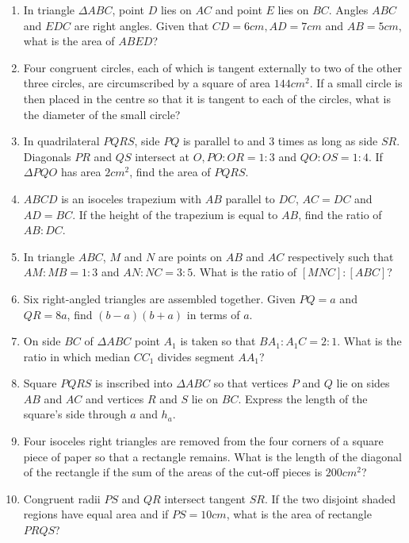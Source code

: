 \documentclass[letterpaper]{article}
\newcommand\itemone{\stepcounter{enumi}\item[$\ast$\, \theenumi.]}
\newcommand\itemtwo{\stepcounter{enumi}\item[$\ast\ast$\, \theenumi.]}
\begin{document}
\begin{enumerate} 

\parskip5em

\item In triangle $\Delta ABC$, point $D$ lies on $AC$ and point $E$ lies on $BC$. Angles $ABC$ and $EDC$ are right angles. Given that $CD=6 cm, AD=7 cm$ and $AB=5 cm$, what is the area of $ABED$?

\item Four congruent circles, each of which is tangent externally to two of the other three circles, are circumscribed by a square of area $144 cm^2$. If a small circle is then placed in the centre so that it is tangent to each of the circles, what is the diameter of the small circle?

\item In quadrilateral $PQRS$, side $PQ$ is parallel to and 3 times as long as side $SR$. Diagonals $PR$ and $QS$ intersect at $O, PO:OR = 1:3$ and $QO:OS = 1:4$. If $\Delta PQO$ has area $2 cm^2$, find the area of $PQRS$.

\item $ABCD$ is an isoceles trapezium with $AB$ parallel to $DC$, $AC=DC$ and $AD=BC$. If the height of the trapezium is equal to $AB$, find the ratio of $AB:DC$.

\item In triangle $ABC$, $M$ and $N$ are points on $AB$ and $AC$ respectively such that $AM:MB = 1:3$ and $AN:NC = 3:5$. What is the ratio of $[MNC]:[ABC]$?

\item Six right-angled triangles are assembled together. Given $PQ=a$ and $QR=8a$, find $(b-a)(b+a)$ in terms of $a$.

\item On side $BC$ of $\Delta ABC$ point $A_1$ is taken so that $BA_1 : A_1C = 2 : 1$. What is the ratio in which median $CC_1$ divides segment $AA_1$?

\item Square $PQRS$ is inscribed into $\Delta ABC$ so that vertices $P$ and $Q$ lie on sides $AB$ and $AC$ and vertices $R$ and $S$ lie on $BC$. Express the length of the square’s side through $a$ and $h_a$.

\itemone Four isoceles right triangles are removed from the four corners of a square piece of paper so that a rectangle remains. What is the length of the diagonal of the rectangle if the sum of the areas of the cut-off pieces is $200 cm^2$?

\itemtwo Congruent radii $PS$ and $QR$ intersect tangent $SR$. If the two disjoint shaded regions have equal area and if $PS=10cm$, what is the area of rectangle $PRQS$?


\end{enumerate}
\end{document}
